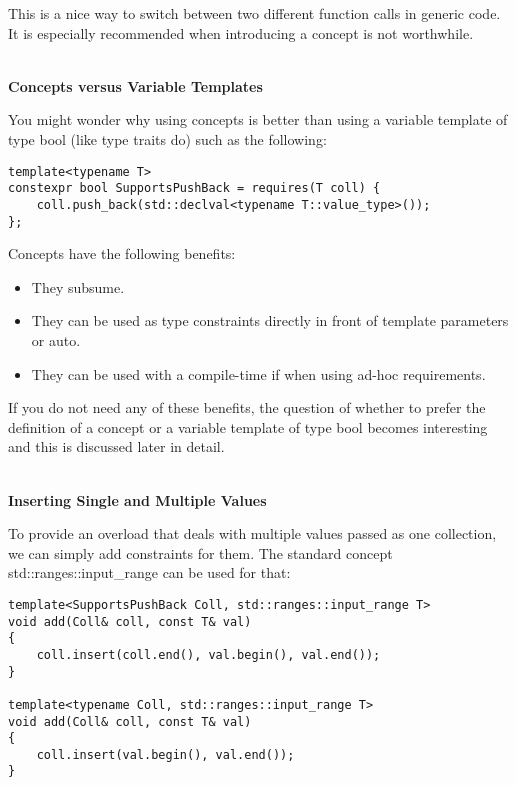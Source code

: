 This is a nice way to switch between two different function calls in generic code. It is especially recommended when introducing a concept is not worthwhile.

\noindent
\hspace*{\fill} \\ %
\textbf{Concepts versus Variable Templates}

You might wonder why using concepts is better than using a variable template of type bool (like type traits do) such as the following:

\begin{lstlisting}[style=styleCXX]
template<typename T>
constexpr bool SupportsPushBack = requires(T coll) {
	coll.push_back(std::declval<typename T::value_type>());
};
\end{lstlisting}

Concepts have the following benefits:

\begin{itemize}
\item
They subsume.

\item
They can be used as type constraints directly in front of template parameters or auto.

\item
They can be used with a compile-time if when using ad-hoc requirements.
\end{itemize}

If you do not need any of these benefits, the question of whether to prefer the definition of a concept or a variable template of type bool becomes interesting and this is discussed later in detail.

\noindent
\hspace*{\fill} \\ %
\textbf{Inserting Single and Multiple Values}

To provide an overload that deals with multiple values passed as one collection, we can simply add constraints for them. The standard concept std::ranges::input\_range can be used for that:

\begin{lstlisting}[style=styleCXX]
template<SupportsPushBack Coll, std::ranges::input_range T>
void add(Coll& coll, const T& val)
{
	coll.insert(coll.end(), val.begin(), val.end());
}

template<typename Coll, std::ranges::input_range T>
void add(Coll& coll, const T& val)
{
	coll.insert(val.begin(), val.end());
}
\end{lstlisting}

